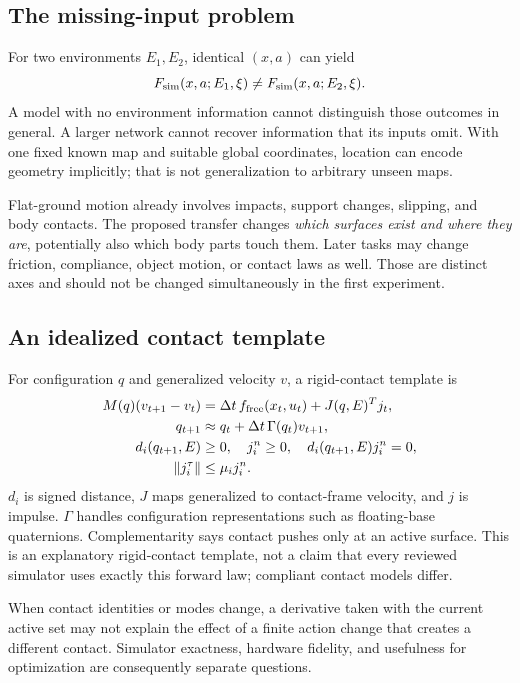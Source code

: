 \subsection{The missing-input problem}
For two environments $E_1,E_2$, identical $(x,a)$ can yield
\begin{equation}
F_{\mathrm{sim}}(x,a;E_1,\xi)\ne F_{\mathrm{sim}}(x,a;E_2,\xi).
\end{equation}
A model with no environment information cannot distinguish those outcomes in
general. A larger network cannot recover information that its inputs omit.
With one fixed known map and suitable global coordinates, location can encode
geometry implicitly; that is not generalization to arbitrary unseen maps.

Flat-ground motion already involves impacts, support changes, slipping, and
body contacts. The proposed transfer changes \emph{which surfaces exist and
where they are}, potentially also which body parts touch them. Later tasks may
change friction, compliance, object motion, or contact laws as well. Those are
distinct axes and should not be changed simultaneously in the first experiment.

\subsection{An idealized contact template}
For configuration $q$ and generalized velocity $v$, a rigid-contact template is
\begin{align}\label{eq:mechanics}
M(q)(v_{t+1}-v_t)&=\Delta t\,f_{\rm free}(x_t,u_t)+J(q,E)^Tj_t,\\
q_{t+1}&\approx q_t+\Delta t\,\Gamma(q_t)v_{t+1},\\
d_i(q_{t+1},E)&\ge0,\quad j_i^n\ge0,\quad d_i(q_{t+1},E)j_i^n=0,\\
\left\lVert j_i^\tau\right\rVert&\le\mu_i j_i^n.
\end{align}
$d_i$ is signed distance, $J$ maps generalized to contact-frame velocity, and
$j$ is impulse. $\Gamma$ handles configuration representations such as floating-base
quaternions. Complementarity says contact pushes only at an active surface.
This is an explanatory rigid-contact template, not a claim that every reviewed
simulator uses exactly this forward law; compliant contact models differ.

When contact identities or modes change, a derivative taken with the current
active set may not explain the effect of a finite action change that creates a
different contact. Simulator exactness, hardware fidelity, and usefulness for
optimization are consequently separate questions.

